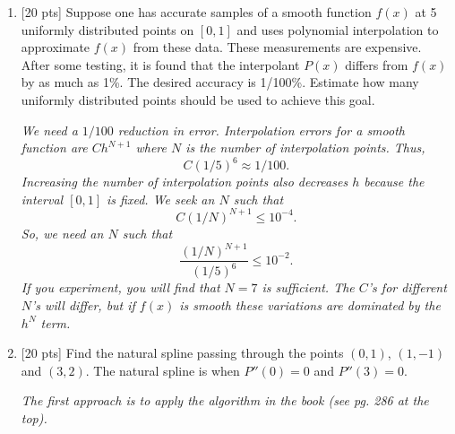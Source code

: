 \documentclass[12pt]{article}
\begin{document}
\begin{enumerate}
{For the first problem, one Jacobi iteration yields $\vec{x}_1 = [0.4
  2.4]$.  The second Jacobi iteration yields $\vec{x}_2 = [1.12
  2.24]$.  Loosely speaking, it looks like we are converging.

For the second problem, one Jacobi iteration yields $\vec{x}_1 = [6.0
  -1.333\ldots]$.  The second Jacobi iteration yields $\vec{x}_2 = [9.333\ldots
  18.666\ldots]$.  We see that the iterates are diverging from the
exact solution.

From lecture, we are guaranteed that Jacobi iterations of diagonally
dominant matrices will always converge.  If a matrix is not diagonally
dominant, the test fails, but in this case, the
iterations are diverging from the exact solution.

}

\newpage

\item{[20 pts]}  Suppose one has accurate samples of a smooth function $f(x)$
  at 5 uniformly distributed points on $[0,1]$ and uses polynomial
  interpolation to approximate $f(x)$ from these data.  These
  measurements are expensive.  After some
  testing, it is found that the interpolant $P(x)$ differs from $f(x)$
  by as much as 1\%.  The desired accuracy is 1/100\%.  Estimate how many
  uniformly distributed points should be used to achieve this goal.

\bigskip

{\em
We need a $1/100$ reduction in error.  Interpolation errors for a
smooth function are $C h^{N+1}$ where $N$ is the number of interpolation
points.  Thus,
\[
C (1/5)^6 \approx 1/100.
\]  Increasing the number of interpolation points also decreases $h$ because the interval $[0,1]$ is fixed.
We seek an $N$ such that
\[
C (1/N)^{N+1} \leq 10^{-4}.
\]
So, we need an $N$ such that
\[
\frac{(1/N)^{N+1}}{(1/5)^6} \leq 10^{-2}.
\]
If you experiment, you will find that $N=7$ is sufficient.  The $C$'s for different $N$'s will differ, but if $f(x)$ is smooth these variations are dominated by the $h^N$ term.

}

\newpage

\item{[20 pts]} Find the natural spline passing through the points
  $(0,1)$, $(1,-1)$ and $(3,2)$.  The natural spline is when $P''(0) =
  0$ and $P''(3) = 0$.

\bigskip
{\em
The first approach is to apply the algorithm in the book (see pg. 286 at the top).

}
\end{enumerate}
\end{document}
